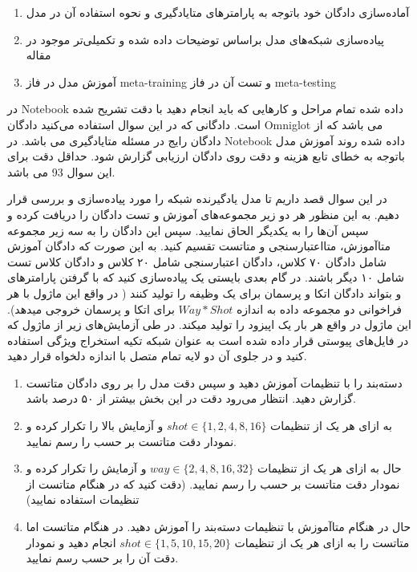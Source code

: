 \documentclass{article}
\begin{document}
\begin{enumerate}
	
	\item
	آماده‌سازی دادگان خود باتوجه به پارامترهای متایادگیری و نحوه استفاده آن در مدل
	\item
	پیاده‌سازی شبکه‌های مدل براساس توضیحات داده شده و تکمیلی‌تر موجود در مقاله
	\item
	آموزش مدل در فاز meta-training و تست آن در فاز meta-testing
	
\end{enumerate}
	
در Notebook داده شده تمام مراحل و کار‌هایی که باید انجام دهید با دقت تشریح شده است. دادگانی که در این سوال استفاده می‌کنید دادگان Omniglot می باشد که از دادگان رایج در مسئله متایادگیری می باشد.
در Notebook داده شده روند آموزش مدل باتوجه به خطای تابع هزینه و دقت روی دادگان ارزیابی گزارش شود. حداقل دقت برای این سوال 93 می باشد.



در این سوال قصد داریم تا مدل یادگیرنده
شبکه
\href{https://arxiv.org/abs/1703.05175}{}
را مورد پیاده‌سازی و بررسی قرار دهیم. به این منظور هر دو زیر مجموعه‌های آموزش و تست دادگان
را دریافت کرده و سپس آن‌ها را به یکدیگر الحاق نمایید. 
سپس این دادگان را به سه زیر مجموعه
متاآموزش، متااعتبارسنجی و متاتست تقسیم کنید. به این صورت که دادگان آموزش شامل دادگان ۷۰ کلاس، دادگان اعتبارسنجی شامل ۲۰ کلاس و دادگان  کلاس تست شامل ۱۰ دیگر باشند.
در گام بعدی بایستی یک 
پیاده‌سازی کنید که با گرفتن پارامترهای
و
بتواند دادگان
اتکا و پرسمان برای یک وظیفه را تولید کنند ( در واقع این ماژول با هر فراخوانی دو مجموعه داده به اندازه
$Way * Shot$
برای اتکا و پرسمان خروجی میدهد). این ماژول در واقع هر بار یک اپیزود را تولید میکند.
در طی آزمایش‌های زیر از ماژول
که در فایل‌های پیوستی قرار داده شده است به عنوان شبکه  تکیه استخراج ویژگی استفاده کنید و در جلوی آن دو لایه تمام متصل با اندازه دلخواه قرار دهید.

\begin{enumerate}


\item
دسته‌بند را با تنظیمات
آموزش دهید و سپس دقت مدل را بر روی دادگان متاتست گزارش دهید.
انتظار می‌رود دقت در این بخش بیشتر از ۵۰ درصد باشد.

\item
به ازای هر یک از تنظیمات
$shot \in \{1, 2, 4, 8, 16\}$
و
آزمایش بالا را تکرار کرده و نمودار دقت متاتست بر حسب
را رسم نمایید.

\item
حال به ازای هر یک از تنظیمات
$way \in \{2, 4, 8, 16, 32\}$
و
آزمایش را تکرار کرده و نمودار دقت متاتست بر حسب
را رسم نمایید.
(دقت کنید که در هنگام متاتست از تنظیمات
استفاده نمایید)


\item
حال در هنگام متاآموزش با تنظیمات
دسته‌بند را آموزش دهید.
در هنگام متاتست اما متاتست را به ازای هر یک از تنظیمات
$shot \in \{1, 5,10, 15, 20\} $
انجام دهید و نمودار دقت آن را بر حسب 
رسم نمایید.

\end{enumerate}
\end{document}
